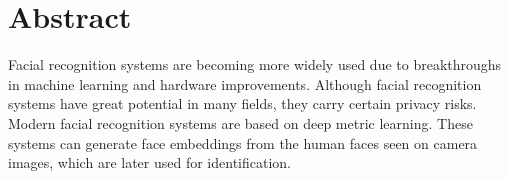 
\newpage
\selectenglish
\section*{Abstract}

Facial recognition systems are becoming more widely used due to breakthroughs in machine learning and hardware improvements. Although facial recognition systems have great potential in many fields, they carry certain privacy risks. Modern facial recognition systems are based on deep metric learning. These systems can generate face embeddings from the human faces seen on camera images, which are later used for identification.

